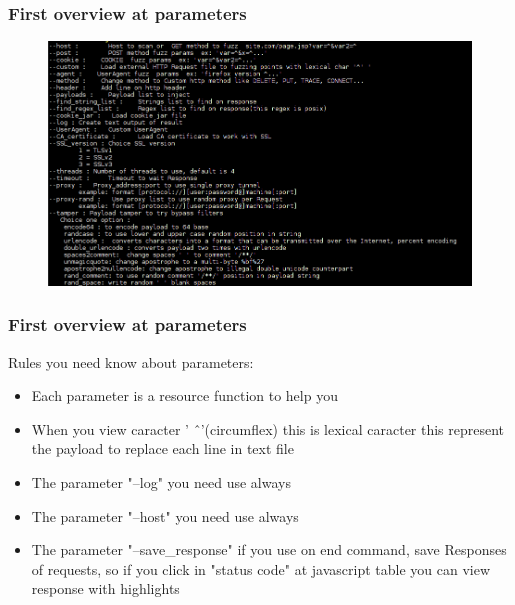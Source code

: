 \documentclass[serif,mathserif]{beamer}
\begin{document}
\begin{frame}
  \frametitle{First overview at parameters}
  \begin{figure}[t]
    \centering
    \includegraphics[width=12cm]{images/overview1.png}
  \end{figure}
\end{frame}

\begin{frame}
  \frametitle{First overview at parameters}
  Rules you need know about parameters:
  \begin{itemize}
  \item Each parameter is a resource function to help you
  \item When you view caracter  ' \^\ '(circumflex)  this is lexical caracter this represent the payload to replace each line in text file 
  \item The parameter "--log" you need use always 
  \item The parameter "--host" you need use always
  \item The parameter "--save\_response" if you use on end command, save Responses of requests, so if you click in "status code" at javascript table you can view response with highlights  
  \end{itemize}
\end{frame}
\end{document}
